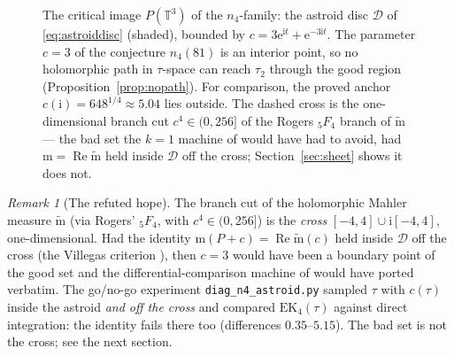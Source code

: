 \documentclass[11pt]{article}
\theoremstyle{definition}
\theoremstyle{remark}
\newtheorem{remark}[theorem]{Remark}
\newcommand{\Tt}{\mathbb{T}}
\newcommand{\ii}{\mathrm{i}}
\newcommand{\e}{\mathrm{e}}
\newcommand{\ImT}{\operatorname{Im}}
\newcommand{\ReT}{\operatorname{Re}}
\newcommand{\m}{\mathrm{m}}
\newcommand{\mt}{\widetilde{\m}}
\begin{document}
\begin{figure}[ht]
\centering
{}
\caption{The critical image $P(\Tt^3)$ of the $n_4$-family: the astroid
disc $\mathcal D$ of \eqref{eq:astroiddisc} (shaded), bounded by
$c=3\e^{\ii t}+\e^{-3\ii t}$. The parameter $c=3$ of the conjecture
$n_4(81)$ is an interior point, so no holomorphic path in $\tau$-space
can reach $\tau_2$ through the good region
(Proposition~\ref{prop:nopath}). For comparison, the proved anchor
$c(\ii)=648^{1/4}\approx5.04$ lies outside. The dashed cross is the
one-dimensional branch cut $c^4\in(0,256]$ of the Rogers ${}_5F_4$
branch of $\mt$ --- the bad set the $k=1$ machine of \cite{Zf} would
have had to avoid, had $\m=\ReT\mt$ held inside $\mathcal D$ off the
cross; Section~\ref{sec:sheet} shows it does not.}
\label{fig:astroid}
\end{figure}

\begin{remark}[The refuted hope]
The branch cut of the holomorphic Mahler measure $\mt$ (via Rogers'
${}_5F_4$, with $c^4\in(0,256]$) is the \emph{cross}
$[-4,4]\cup\ii[-4,4]$, one-dimensional. Had the identity
$\m(P+c)=\ReT\mt(c)$ held inside $\mathcal D$ off the cross (the
Villegas criterion \cite{RV}), then $c=3$ would have been a boundary
point of the good set and the differential-comparison machine of
\cite{Zf} would have ported verbatim. The go/no-go experiment
\texttt{diag\_n4\_astroid.py} sampled $\tau$ with $c(\tau)$ inside the
astroid \emph{and off the cross} and compared $\mathrm{EK}_4(\tau)$
against direct integration: the identity fails there too
(differences $0.35$--$5.15$). The bad set is not the cross; see the next
section.
\end{remark}
\end{document}
